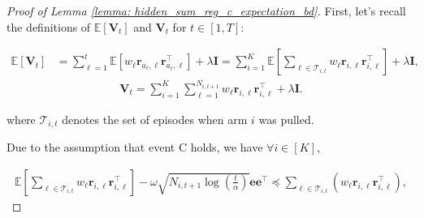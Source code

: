 \begin{proof}[Proof of Lemma \ref{lemma: hidden_sum_reg_c_expectation_bd}]

First, let's recall the definitions of $\mathbb{E}[\boldsymbol{V}_t]$ and $\boldsymbol{V}_t$ for $t \in [1,T]$:

\begin{equation}
\begin{aligned}
\label{eq: expected_upsilon_def}
\mathbb{E}[\boldsymbol{V}_t] & = \sum_{\ell=1}^{t} \mathbb{E}[w_{\ell} \boldsymbol{r}_{a_{\ell}, \ell} \boldsymbol{r}_{a_{\ell}, \ell}^{\top}] + \lambda \boldsymbol{I} 
 =
\sum_{i=1}^{K} \mathbb{E} \left[ \sum_{\ell \in \mathcal{T}_{i,t}} w_{\ell} \boldsymbol{r}_{i,\ell} \boldsymbol{r}_{i,\ell}^{\top} \right] + \lambda \boldsymbol{I}
,
\end{aligned}
\end{equation}
\[
\begin{aligned}
\boldsymbol{V}_t 
=
\sum_{i=1}^{K} \sum_{\ell=1}^{N_{i,t+1}} w_{\ell} \boldsymbol{r}_{i, \ell} \boldsymbol{r}_{i, \ell}^{\top} + \lambda \boldsymbol{I} .
\end{aligned}
\]

where 
$\mathcal{T}_{i,t}$ denotes the set of episodes when arm $i$ was pulled.

Due to the assumption that event C holds, we have $\forall i \in [K]$,

\[
\begin{aligned}
\mathbb{E} \left[ \sum_{\ell \in \mathcal{T}_{i,t}} w_{\ell} \boldsymbol{r}_{i,\ell} \boldsymbol{r}_{i,\ell}^{\top} \right]
-
\omega \sqrt{ N_{i,t+1} \log \left( \frac{t}{\alpha} \right)} \boldsymbol{e e}^{\top}
\preceq
\sum_{\ell \in \mathcal{T}_{i,t}} \left( w_{\ell} \boldsymbol{r}_{i,\ell} \boldsymbol{r}_{i,\ell}^{\top} \right),
\end{aligned}
\]


\end{proof}
